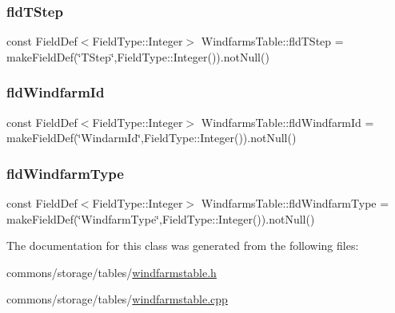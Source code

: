 \mbox{\label{class_windfarms_table_a237f9960b4a08d37769a10c43717d574}} 
\subsubsection{\texorpdfstring{fldTStep}{fldTStep}}
{\footnotesize\ttfamily const Field\+Def$<$Field\+Type\+::\+Integer$>$ Windfarms\+Table\+::fld\+T\+Step = make\+Field\+Def(\char`\"{}T\+Step\char`\"{},Field\+Type\+::\+Integer()).not\+Null()}

\mbox{\label{class_windfarms_table_a3bf4f700e6b6a28688e0c9401036a624}} 
\subsubsection{\texorpdfstring{fldWindfarmId}{fldWindfarmId}}
{\footnotesize\ttfamily const Field\+Def$<$Field\+Type\+::\+Integer$>$ Windfarms\+Table\+::fld\+Windfarm\+Id = make\+Field\+Def(\char`\"{}Windarm\+Id\char`\"{},Field\+Type\+::\+Integer()).not\+Null()}

\mbox{\label{class_windfarms_table_ae386df578cdf8c90a1a9c05b021902eb}} 
\subsubsection{\texorpdfstring{fldWindfarmType}{fldWindfarmType}}
{\footnotesize\ttfamily const Field\+Def$<$Field\+Type\+::\+Integer$>$ Windfarms\+Table\+::fld\+Windfarm\+Type = make\+Field\+Def(\char`\"{}Windfarm\+Type\char`\"{},Field\+Type\+::\+Integer()).not\+Null()}



The documentation for this class was generated from the following files\+:\begin{DoxyCompactItemize}
\item 
commons/storage/tables/\mbox{\hyperlink{windfarmstable_8h}{windfarmstable.\+h}}\item 
commons/storage/tables/\mbox{\hyperlink{windfarmstable_8cpp}{windfarmstable.\+cpp}}\end{DoxyCompactItemize}
